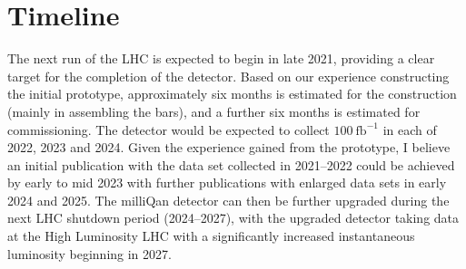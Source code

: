 \documentclass[11pt]{article}
\theoremstyle{plain} \numberwithin{equation}{section}
\theoremstyle{definition}
\begin{document}
\section*{Timeline}

The next run of the LHC is expected to begin in late 2021, providing a clear target 
for the completion of the detector. Based on our experience constructing the initial prototype, 
approximately six months is estimated for the construction (mainly in assembling the bars),
and a further six months is estimated for commissioning. The detector would be expected to 
collect $100~\text{fb}^{-1}$ in each of 2022, 2023 and 2024.
Given the experience gained from the prototype, I believe an initial publication with the data set collected 
in 2021--2022 could be achieved by early to mid 2023 with further publications with enlarged data sets 
in early 2024 and 2025. The milliQan detector can then be further 
upgraded during the next LHC shutdown period (2024--2027), with the upgraded
detector taking data at the High Luminosity LHC with a significantly increased instantaneous luminosity beginning in 2027. 



% 
\end{document}
